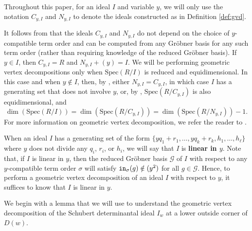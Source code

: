 \documentclass[12pt,reqno]{amsart}
\newtheorem{Main Conjecture}[theorem]{Main Conjecture}
\theoremstyle{remark}
\theoremstyle{plain}
\newcommand{\mydef}[1]{{\bf #1}}
\newcommand{\init}{{\tt in}}
\newcommand{\spec}{{\mbox{Spec}}}
\begin{document}
Throughout this paper, for an ideal $I$ and variable $y$, we will only use the notation $C_{y,I}$ and $N_{y,I}$ to denote the ideals constructed as in Definition \ref{def:gvd}.

It follows from \cite[Theorem 2.1]{KMY09} that the ideals $C_{y,I}$ and $N_{y,I}$ do not depend on the choice of $y$-compatible term order and can be computed from any Gr\"obner basis for any such term order (rather than requiring knowledge of the reduced Gr\"obner basis).  If $y \in I$, then $C_{y,I} = R$ and $N_{y,I}+(y) = I$.  We will be performing geometric vertex decompositions only  when $\spec (R/I)$ is reduced and equidimensional.  In this case and when $y \notin I$, then, by \cite[Proposition 2.4]{KR}, either $N_{y,I} = C_{y,I}$, in which case $I$ has a generating set that does not involve $y$, or, by  \cite[Lemma 2.8]{KR}, $\spec (R/C_{y,I})$ is also equidimensional, and \[
\dim(\spec (R/I) )= \dim(\spec (R/C_{y,I})) = \dim(\spec (R/N_{y,I}))-1.
\]  For more information on geometric vertex decomposition, we refer the reader to \cite{KMY09, KR}. 

When an ideal $I$ has a generating set of the form $\{yq_1+r_1, \ldots, yq_k+r_k, h_1, \ldots, h_\ell\}$ where $y$ does not divide any $q_i$, $r_i$, or $h_i$, we will say that $I$ is \mydef{linear in $y$}.  Note that, if $I$ is linear in $y$, then the reduced Gr\"obner basis $\mathcal{G}$ of $I$ with respect to any $y$-compatible term order $\sigma$ will satisfy $\init_\sigma(g) \notin (y^2)$ for all $g \in \mathcal{G}$.  Hence, to perform a geometric vertex decomposition of an ideal $I$ with respect to $y$, it suffices to know that $I$ is linear in $y$.

We begin with a lemma that we will use to understand the geometric vertex decomposition of the Schubert determinantal ideal $I_w$ at a lower outside corner of $D(w)$.
\end{document}
